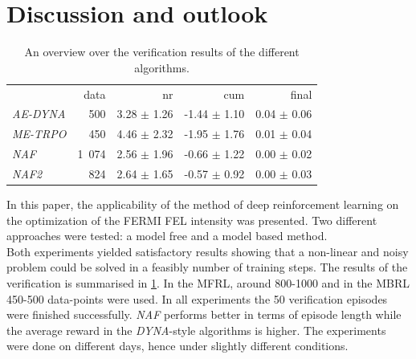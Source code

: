 \documentclass[
reprint,
amsmath,amssymb,amsfonts,clevref,
aps,
prstab,
]{revtex4-2}
\begin{document}
	\section{Discussion and outlook}
	\begin{table}[b]%
		\caption{\label{tab:overview_verification}%
			An overview over the verification results of the different algorithms.
		}
		\begin{ruledtabular}
			\begin{tabular}{lrrrr}
				&  data&  nr&  cum &   final \\
				\emph{AE-DYNA} &500 &  3.28 $\pm$  1.26 & -1.44 $\pm$  1.10 &  0.04 $\pm$  0.06\\
				\emph{ME-TRPO} &450&  4.46 $\pm$  2.32 & -1.95 $\pm$  1.76 &  0.01 $\pm$  0.04\\
				\emph{NAF} &1 074&  2.56 $\pm$  1.96 & -0.66 $\pm$  1.22 &0.00 $\pm$  0.02\\
				\emph{NAF2} &824& 2.64 $\pm$  1.65 & -0.57 $\pm$  0.92 &0.00 $\pm$  0.03\\
			\end{tabular}
		\end{ruledtabular}
	\end{table}
	In this paper, the applicability of the method of deep reinforcement learning on the optimization of the FERMI FEL intensity was presented. Two different approaches were tested: a model free and a model based method.\\
	 Both experiments yielded satisfactory results showing that a non-linear and noisy problem could be solved in a feasibly number of training steps. The results of the verification is summarised in \cref{tab:overview_verification}. In the MFRL, around 800-1000 and in the MBRL 450-500 data-points were used. In all experiments the 50 verification episodes were finished successfully. \emph{NAF} performs better in terms of episode length while the average reward in the \emph{DYNA}-style algorithms is higher. The experiments were done on different days, hence under slightly different conditions.\\
\end{document}
